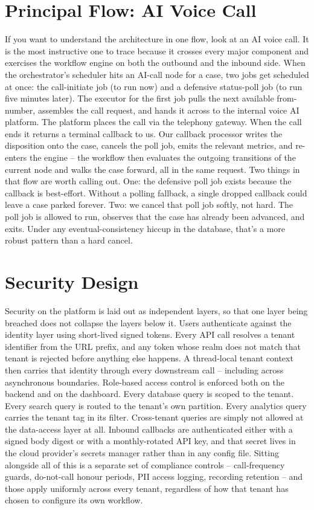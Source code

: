 \section{Principal Flow: AI Voice Call}

If you want to understand the architecture in one flow, look at an AI voice call. It is the most instructive one to trace because it crosses every major component and exercises the workflow engine on both the outbound and the inbound side. When the orchestrator's scheduler hits an AI-call node for a case, two jobs get scheduled at once: the call-initiate job (to run now) and a defensive status-poll job (to run five minutes later). The executor for the first job pulls the next available from-number, assembles the call request, and hands it across to the internal voice AI platform. The platform places the call via the telephony gateway. When the call ends it returns a terminal callback to us. Our callback processor writes the disposition onto the case, cancels the poll job, emits the relevant metrics, and re-enters the engine -- the workflow then evaluates the outgoing transitions of the current node and walks the case forward, all in the same request. Two things in that flow are worth calling out. One: the defensive poll job exists because the callback is best-effort. Without a polling fallback, a single dropped callback could leave a case parked forever. Two: we cancel that poll job softly, not hard. The poll job is allowed to run, observes that the case has already been advanced, and exits. Under any eventual-consistency hiccup in the database, that's a more robust pattern than a hard cancel.

\section{Security Design}

Security on the platform is laid out as independent layers, so that one layer being breached does not collapse the layers below it. Users authenticate against the identity layer using short-lived signed tokens. Every API call resolves a tenant identifier from the URL prefix, and any token whose realm does not match that tenant is rejected before anything else happens. A thread-local tenant context then carries that identity through every downstream call -- including across asynchronous boundaries. Role-based access control is enforced both on the backend and on the dashboard. Every database query is scoped to the tenant. Every search query is routed to the tenant's own partition. Every analytics query carries the tenant tag in its filter. Cross-tenant queries are simply not allowed at the data-access layer at all. Inbound callbacks are authenticated either with a signed body digest or with a monthly-rotated API key, and that secret lives in the cloud provider's secrets manager rather than in any config file. Sitting alongside all of this is a separate set of compliance controls -- call-frequency guards, do-not-call honour periods, PII access logging, recording retention -- and those apply uniformly across every tenant, regardless of how that tenant has chosen to configure its own workflow.
